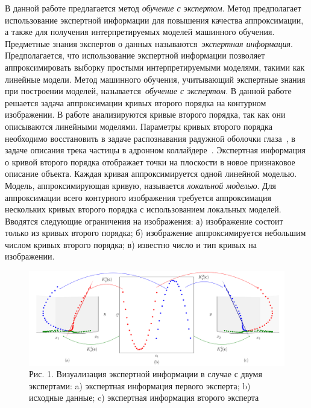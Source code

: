 \documentclass[12pt]{a&t}
\begin{document}
В данной работе предлагается метод \textit{обучение с экспертом}.
Метод предполагает использование экспертной информации для повышения качества аппроксимации, а также для получения интерпретируемых моделей машинного обучения.
Предметные знания экспертов о данных называются~\textit{экспертная информация}.
Предполагается, что использование экспертной информации позволяет аппроксимировать выборку простыми интерпретируемыми моделями, такими как линейные модели. Метод машинного обучения, учитывающий экспертные знания при построении моделей, называется~\textit{обучение с экспертом}.
В данной работе решается задача аппроксимации кривых второго порядка на контурном изображении.
В работе анализируются кривые второго порядка, так как они описываются линейными моделями. Параметры кривых второго порядка необходимо восстановить в задаче распознавания радужной оболочки глаза~\cite{Matveev2010, Matveev2014, Bowyer2010}, в задаче описания трека частицы в адронном коллайдере~\cite{Dalila2018}.
Экспертная информация о кривой второго порядка отображает точки на плоскости в новое признаковое описание объекта. 
Каждая кривая аппроксимируется одной линейной моделью.
Модель, аппроксимирующая кривую, называется \textit{локальной моделью}.
Для аппроксимации всего контурного изображения требуется аппроксимация нескольких кривых второго порядка с использованием локальных моделей.
Вводятся следующие ограничения на изображения: а) изображение состоит только из кривых второго порядка; б) изображение аппроксимируется небольшим числом кривых второго порядка; в) известно число и тип кривых на изображении.

\begin{figure}[h!]
  \includegraphics[width=\textwidth]{explanation}
  \caption {Рис. 1. Визуализация экспертной информации в случае с двумя экспертами: a) экспертная информация первого эксперта; b) исходные данные; c) экспертная информация второго эксперта}
  \label{intro:fig2}
\end{figure}
\end{document}
